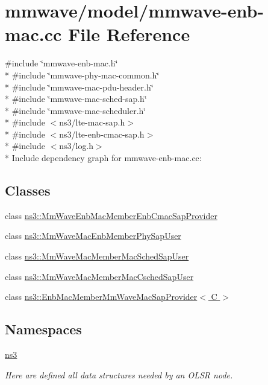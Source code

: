 \hypertarget{mmwave-enb-mac_8cc}{}\section{mmwave/model/mmwave-\/enb-\/mac.cc File Reference}
\label{mmwave-enb-mac_8cc}
{\ttfamily \#include \char`\"{}mmwave-\/enb-\/mac.\+h\char`\"{}}\\*
{\ttfamily \#include \char`\"{}mmwave-\/phy-\/mac-\/common.\+h\char`\"{}}\\*
{\ttfamily \#include \char`\"{}mmwave-\/mac-\/pdu-\/header.\+h\char`\"{}}\\*
{\ttfamily \#include \char`\"{}mmwave-\/mac-\/sched-\/sap.\+h\char`\"{}}\\*
{\ttfamily \#include \char`\"{}mmwave-\/mac-\/scheduler.\+h\char`\"{}}\\*
{\ttfamily \#include $<$ns3/lte-\/mac-\/sap.\+h$>$}\\*
{\ttfamily \#include $<$ns3/lte-\/enb-\/cmac-\/sap.\+h$>$}\\*
{\ttfamily \#include $<$ns3/log.\+h$>$}\\*
Include dependency graph for mmwave-\/enb-\/mac.cc\+:
\subsection*{Classes}
\begin{DoxyCompactItemize}
\item 
class \hyperlink{classns3_1_1MmWaveEnbMacMemberEnbCmacSapProvider}{ns3\+::\+Mm\+Wave\+Enb\+Mac\+Member\+Enb\+Cmac\+Sap\+Provider}
\item 
class \hyperlink{classns3_1_1MmWaveMacEnbMemberPhySapUser}{ns3\+::\+Mm\+Wave\+Mac\+Enb\+Member\+Phy\+Sap\+User}
\item 
class \hyperlink{classns3_1_1MmWaveMacMemberMacSchedSapUser}{ns3\+::\+Mm\+Wave\+Mac\+Member\+Mac\+Sched\+Sap\+User}
\item 
class \hyperlink{classns3_1_1MmWaveMacMemberMacCschedSapUser}{ns3\+::\+Mm\+Wave\+Mac\+Member\+Mac\+Csched\+Sap\+User}
\item 
class \hyperlink{classns3_1_1EnbMacMemberMmWaveMacSapProvider}{ns3\+::\+Enb\+Mac\+Member\+Mm\+Wave\+Mac\+Sap\+Provider$<$ C $>$}
\end{DoxyCompactItemize}
\subsection*{Namespaces}
\begin{DoxyCompactItemize}
\item 
 \hyperlink{namespacens3}{ns3}
\begin{DoxyCompactList}\small\item\em Here are defined all data structures needed by an O\+L\+SR node. \end{DoxyCompactList}\end{DoxyCompactItemize}
